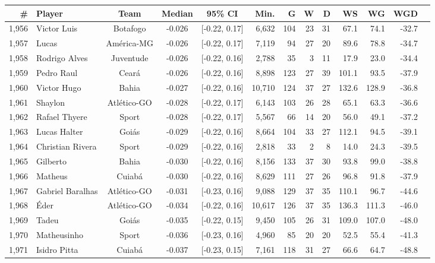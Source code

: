 \begin{table}[htbp]
    \centering
    \tiny
    \begin{tabular}{rlcccrrrrrrrr}
        \toprule
        \# & Player & Team & Median & 95\% CI & Min. & G & W & D & WS & WG & WGD \\
        \midrule
        1,956 & Victor Luis & Botafogo & -0.026 & [-0.22, 0.17] & 6,632 & 104 & 23 & 31 & 67.1 & 74.1 & -32.7 \\
        1,957 & Lucas & América-MG & -0.026 & [-0.22, 0.17] & 7,119 & 94 & 27 & 20 & 89.6 & 78.8 & -34.7 \\
        1,958 & Rodrigo Alves & Juventude & -0.026 & [-0.22, 0.16] & 2,788 & 35 & 3 & 11 & 17.9 & 23.0 & -34.4 \\
        1,959 & Pedro Raul & Ceará & -0.026 & [-0.22, 0.16] & 8,898 & 123 & 27 & 39 & 101.1 & 93.5 & -37.9 \\
        1,960 & Victor Hugo & Bahia & -0.027 & [-0.22, 0.16] & 10,710 & 124 & 37 & 27 & 132.6 & 128.9 & -36.8 \\
        1,961 & Shaylon & Atlético-GO & -0.028 & [-0.22, 0.17] & 6,143 & 103 & 26 & 28 & 65.1 & 63.3 & -36.6 \\
        1,962 & Rafael Thyere & Sport & -0.028 & [-0.22, 0.17] & 5,567 & 66 & 14 & 20 & 56.0 & 49.1 & -37.2 \\
        1,963 & Lucas Halter & Goiás & -0.029 & [-0.22, 0.16] & 8,664 & 104 & 33 & 27 & 112.1 & 94.5 & -39.1 \\
        1,964 & Christian Rivera & Sport & -0.029 & [-0.22, 0.16] & 2,818 & 33 & 2 & 8 & 14.0 & 24.3 & -39.5 \\
        1,965 & Gilberto & Bahia & -0.030 & [-0.22, 0.16] & 8,156 & 133 & 37 & 30 & 93.8 & 99.0 & -38.8 \\
        1,966 & Matheus & Cuiabá & -0.030 & [-0.22, 0.16] & 8,629 & 111 & 27 & 26 & 96.8 & 91.8 & -37.9 \\
        1,967 & Gabriel Baralhas & Atlético-GO & -0.031 & [-0.23, 0.16] & 9,088 & 129 & 37 & 35 & 110.1 & 96.7 & -44.6 \\
        1,968 & Éder & Atlético-GO & -0.034 & [-0.22, 0.16] & 10,617 & 126 & 37 & 35 & 136.3 & 111.3 & -46.0 \\
        1,969 & Tadeu & Goiás & -0.035 & [-0.22, 0.15] & 9,450 & 105 & 26 & 31 & 109.0 & 107.0 & -48.0 \\
        1,970 & Matheusinho & Sport & -0.036 & [-0.23, 0.16] & 4,960 & 85 & 20 & 20 & 52.5 & 55.4 & -41.3 \\
        1,971 & Isidro Pitta & Cuiabá & -0.037 & [-0.23, 0.15] & 7,161 & 118 & 31 & 27 & 66.6 & 64.7 & -48.8 \\

\end{tabular}
\end{table}
